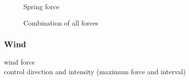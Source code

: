\documentclass[11pt,a4paper]{scrartcl}
\begin{document}
\begin{figure}[htbp]
\centering
{}
\caption{Spring force}
\end{figure}

\begin{figure}[htbp]
\centering
{}
\caption{Combination of all forces}
\end{figure}


\subsubsection{Wind}
wind force \\ control direction and intensity (maximum force and interval)
\end{document}
